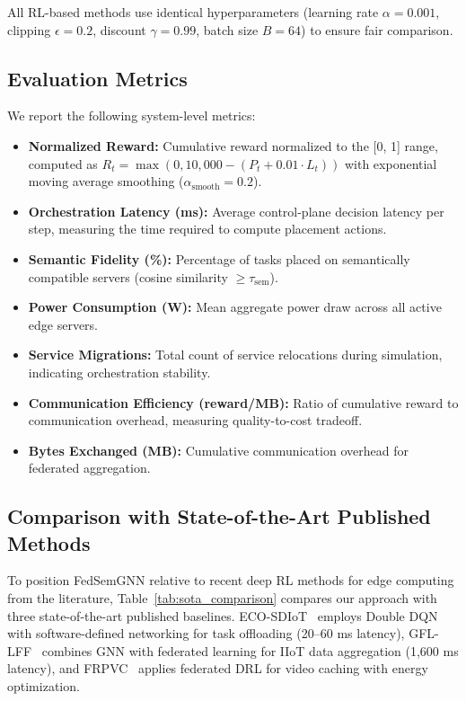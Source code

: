 All RL-based methods use identical hyperparameters (learning rate $\alpha = 0.001$, clipping $\epsilon = 0.2$, discount $\gamma = 0.99$, batch size $B = 64$) to ensure fair comparison.

\subsection{Evaluation Metrics}
We report the following system-level metrics:
\begin{itemize}
	\item \textbf{Normalized Reward:} Cumulative reward normalized to the [0, 1] range, computed as $R_t = \max(0, 10{,}000 - (P_t + 0.01 \cdot L_t))$ with exponential moving average smoothing ($\alpha_{\text{smooth}} = 0.2$).
	\item \textbf{Orchestration Latency (ms):} Average control-plane decision latency per step, measuring the time required to compute placement actions.
	\item \textbf{Semantic Fidelity (\%):} Percentage of tasks placed on semantically compatible servers (cosine similarity $\geq \tau_{\text{sem}}$).
	\item \textbf{Power Consumption (W):} Mean aggregate power draw across all active edge servers.
	\item \textbf{Service Migrations:} Total count of service relocations during simulation, indicating orchestration stability.
	\item \textbf{Communication Efficiency (reward/MB):} Ratio of cumulative reward to communication overhead, measuring quality-to-cost tradeoff.
	\item \textbf{Bytes Exchanged (MB):} Cumulative communication overhead for federated aggregation.
\end{itemize}

\subsection{Comparison with State-of-the-Art Published Methods}

To position FedSemGNN relative to recent deep RL methods for edge computing from the literature, Table~\ref{tab:sota_comparison} compares our approach with three state-of-the-art published baselines. ECO-SDIoT~\cite{zhu2023eco} employs Double DQN with software-defined networking for task offloading (20--60 ms latency), GFL-LFF~\cite{regan2024gfl} combines GNN with federated learning for IIoT data aggregation (1,600 ms latency), and FRPVC~\cite{qian2025frpvc} applies federated DRL for video caching with energy optimization.

